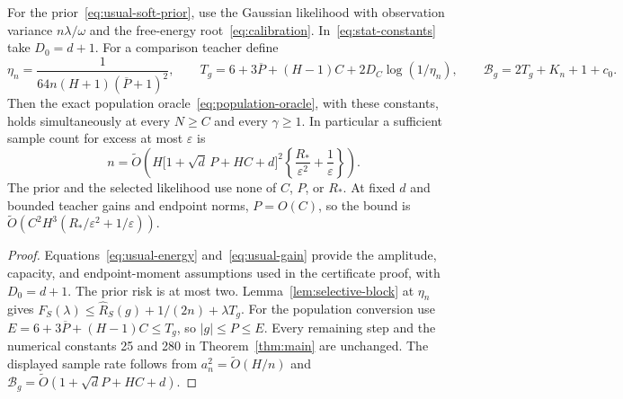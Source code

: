 \begin{theorem}
\label{thm:usual-soft-oracle}
For the prior~\eqref{eq:usual-soft-prior}, use the Gaussian likelihood with observation variance $n\lambda/\omega$ and the free-energy root~\eqref{eq:calibration}. In~\eqref{eq:stat-constants} take $D_0=d+1$. For a comparison teacher define
\[
 \eta_n=\frac1{64n(H+1)(\overline P+1)^2},\qquad
 T_g=6+3\overline P+(H-1)C+2D_C\log(1/\eta_n),\qquad
 \mathcal B_g=2T_g+K_n+1+c_0.
\]
Then the exact population oracle~\eqref{eq:population-oracle}, with these constants, holds simultaneously at every $N\ge C$ and every $\gamma\ge1$. In particular a sufficient sample count for excess at most $\varepsilon$ is
\begin{equation}
 n=\widetilde O\left(
 H\bigl[1+\sqrt d\,P+HC+d\bigr]^2
 \left\{\frac{R_*}{\varepsilon^2}+\frac1\varepsilon\right\}\right).
 \label{eq:usual-soft-samples}
\end{equation}
The prior and the selected likelihood use none of $C$, $P$, or $R_*$. At fixed $d$ and bounded teacher gains and endpoint norms, $P=O(C)$, so the bound is $\widetilde O(C^2H^3(R_*/\varepsilon^2+1/\varepsilon))$.
\end{theorem}
\begin{proof}
Equations~\eqref{eq:usual-energy} and~\eqref{eq:usual-gain} provide the amplitude, capacity, and endpoint-moment assumptions used in the certificate proof, with $D_0=d+1$. The prior risk is at most two. Lemma~\ref{lem:selective-block} at $\eta_n$ gives
$F_S(\lambda)\le\widehat R_S(g)+1/(2n)+\lambda T_g$.
For the population conversion use $E=6+3\overline P+(H-1)C\le T_g$, so $|g|\le P\le E$. Every remaining step and the numerical constants 25 and 280 in Theorem~\ref{thm:main} are unchanged. The displayed sample rate follows from $a_n^2=\widetilde O(H/n)$ and $\mathcal B_g=\widetilde O(1+\sqrt dP+HC+d)$.
\end{proof}
